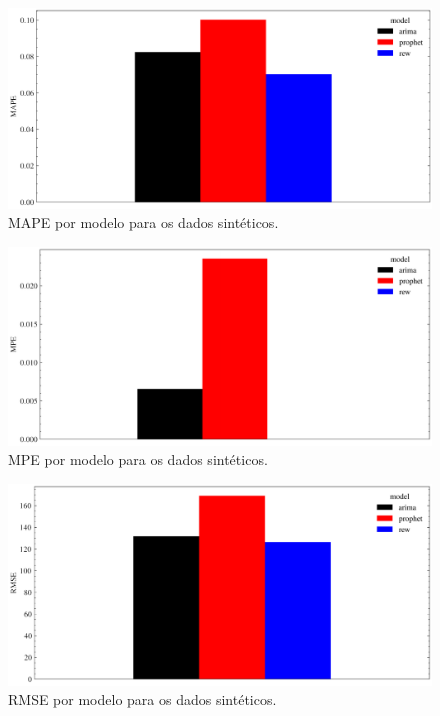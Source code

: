 \begin{figure}[!htp]
    \centering
    \includegraphics[width=5.0in]{img/synthetic_mape_comparison.pdf}
    \caption{MAPE por modelo para os dados sintéticos.}
\end{figure}

\begin{figure}[!htp]
    \centering
    \includegraphics[width=5.0in]{img/synthetic_mpe_comparison.pdf}
    \caption{MPE por modelo para os dados sintéticos.}
\end{figure}

\begin{figure}[!htp]
    \centering
    \includegraphics[width=5.0in]{img/synthetic_rmse_comparison.pdf}
    \caption{RMSE por modelo para os dados sintéticos.}
\end{figure}
